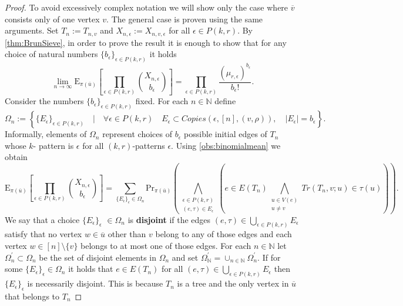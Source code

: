 \documentclass[12pt,notitlepage,a4paper]{article}
\theoremstyle{definition}
\newcommand{\N}{\mathbb{N}}
\newcommand{\Ln}{\lim\limits_{n\to \infty}}
\begin{document}
\begin{proof}
	To avoid excessively complex notation we will show only the case where
	$\overline{v}$ consists only of one vertex $v$. The general case is proven
	using the same arguments. Set $T_n:=T_{n,v}$ and 
	$X_{n,\epsilon}:=X_{n,v,\epsilon}$ for all $\epsilon\in P(k,r)$.
	By \cref{thm:BrunSieve},
	in order to prove the result it is enough to show that 
	for any choice of natural numbers $\{b_\epsilon\}_{\epsilon\in P(k,r)}$
	it holds
	\begin{equation} \label{eqn:binomexpedges}
	\Ln
	\mathrm{E}_{\pi(\overline{u})}
	\left[
	\prod_{\epsilon\in P(k,r)} \binom{X_{n,\epsilon}}{b_\epsilon}	
	\right]
	= \prod_{\epsilon\in P(k,r)} \frac{(\mu_{r,\epsilon})^
		{b_\epsilon}}{b_\epsilon!}.	
	\end{equation}
	Consider the numbers $\{b_\epsilon\}_{\epsilon\in P(k,r)}$
	fixed. 
	For each $n\in \N$ define
	\[
	\Omega_n:=\left\{
	\{E_\epsilon\}_{\epsilon\in P(k,r)} \quad 
	\Big | \quad \forall \epsilon\in P(k,r) \quad
	E_\epsilon\subset Copies(\epsilon,[n],(v,\rho)), 
	\quad |E_\epsilon|=b_\epsilon	
	\right\}.		
	\]
	Informally, elements of $\Omega_n$ represent choices of 
	$b_\epsilon$ possible initial edges of $T_n$ whose $k$-
	pattern is $\epsilon$ for all $(k,r)$-patterns $\epsilon$. 	
	Using \cref{obs:binomialmean} we obtain
	\[
	\mathrm{E}_{\pi(\overline{u})}
	\left[
	\prod_{\epsilon\in P(k,r)} \binom{X_{n,\epsilon}}{b_\epsilon}	
	\right]
	= 
	\sum_{
		\{E_\epsilon\}_{\epsilon}
		\in \Omega_n}
	\mathrm{Pr}_{\pi(\overline{u})}\left(
	\bigwedge_{\substack{
			\epsilon\in P(k,r)\\
			(e, \tau)\in E_{\epsilon}
	}} \left(
	e\in E(T_n) \bigwedge_{\substack{
			u\in V(e)\\
			u\neq v}} Tr(T_n,v;u)\in \tau(u)		
	\right)
	\right). 		
	\]
	We say that a choice $\{E_\epsilon\}_{\epsilon}$
	$\in \Omega_n$ is \textbf{disjoint} if the edges
	$(e,\tau)\in\bigcup_{\epsilon\in P(k,r)} E_\epsilon$ satisfy
	that no vertex $w\in \overline{u}$ other than $v$ belong to any
	of those edges and each vertex 
	$w\in [n]\setminus\{v\}$ belongs to at most one of those edges. 
	For each $n\in \N$ let $\Omega_n^\prime\subset \Omega_n$ 
	be the set	of disjoint elements in $\Omega_n$ and set
	$\Omega^\prime_\N= \cup_{n\in \N} \Omega^\prime_n$.
	If for some
	$\{E_\epsilon\}_\epsilon \in \Omega_n$ 
	it holds that $e\in E(T_n)$ for all $(e,\tau)\in
	\bigcup_{\epsilon\in P(k,r)} E_\epsilon$ 
	then $\{E_\epsilon\}_\epsilon$ 
	is necessarily disjoint. 
	This is because $T_n$ is a tree and
	the only vertex in  $\overline{u}$ that belongs to $T_n$ 

\end{proof}
\end{document}
